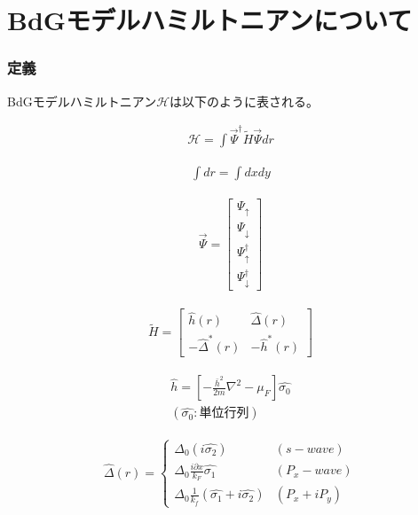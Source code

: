 \documentclass{jsarticle}
\begin{document}
\part{BdGモデルハミルトニアンについて}
	\section{定義}
		BdGモデルハミルトニアン$\mathcal{H}$は以下のように表される。

		\begin{align}
			\mathcal{H}=\int \vec{\Psi}^\dagger \tilde{H}\vec{\Psi}dr
		\end{align}

		\begin{align}
			\int dr=\int dxdy
		\end{align}

		\begin{align}
			\vec{\Psi}=
			\begin{bmatrix}
				\Psi_\uparrow \\
				\Psi_\downarrow \\
				\Psi_\uparrow^\dagger \\
				\Psi_\downarrow^\dagger
			\end{bmatrix}
		\end{align}

		\begin{align}
			\tilde{H}=
			\begin{bmatrix}
				\hat{h}(r) & \hat{\Delta}(r) \\
				-\hat{\Delta}^\ast(r) & -\hat{h}^\ast(r)
			\end{bmatrix}
		\end{align}

		\begin{align}
			\hat{h}=\left[-\frac{\bar{h}^2}{2m}\nabla^2-\mu_F \right]\hat{\sigma_0}　\\
			\left( \hat{\sigma_0}:単位行列 \right)
		\end{align}

		\begin{align}
			\hat{\Delta}(r)=
			\begin{cases}
				\Delta_0 \left( i \hat{\sigma_2} \right) & \left( s-wave \right) \\
				\Delta_0\frac{i\partial x}{k_F}\hat{\sigma_1} & \left( P_x-wave \right) \\
				\Delta_0\frac{1}{k_f} \left( \hat{\sigma_1}+i\hat{\sigma_2} \right) & \left( P_x+iP_y \right)
			\end{cases}
		\end{align}
\end{document}
